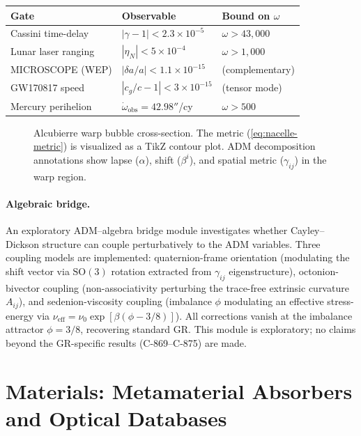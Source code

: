 \documentclass[12pt,openany]{report}
\theoremstyle{definition}
\theoremstyle{plain}
\theoremstyle{remark}
\begin{document}
\begin{center}
\begin{tabular}{lll}
\toprule
\textbf{Gate} & \textbf{Observable} & \textbf{Bound on $\omega$} \\
\midrule
Cassini time-delay  & $|\gamma-1| < 2.3\times10^{-5}$ & $\omega > 43{,}000$ \\
Lunar laser ranging & $|\eta_N| < 5\times10^{-4}$     & $\omega > 1{,}000$ \\
MICROSCOPE (WEP)    & $|\delta a/a| < 1.1\times10^{-15}$ & (complementary) \\
GW170817 speed      & $|c_g/c - 1| < 3\times10^{-15}$ & (tensor mode) \\
Mercury perihelion  & $\dot\omega_{\mathrm{obs}} = 42.98''$/cy & $\omega > 500$ \\
\bottomrule
\end{tabular}
\end{center}

\begin{figure}[htbp]
\centering

\caption{Alcubierre warp bubble cross-section.  The metric
(\cref{eq:nacelle-metric}) is visualized as a TikZ contour plot.
ADM decomposition annotations show lapse ($\alpha$), shift
($\beta^i$), and spatial metric ($\gamma_{ij}$) in the warp region.}
\label{fig:warp-bubble}
\end{figure}

\paragraph{Algebraic bridge.}
An exploratory ADM--algebra bridge module investigates whether
Cayley--Dickson structure can couple perturbatively to the ADM
variables.  Three coupling models are implemented:
quaternion-frame orientation (modulating the shift vector via $\mathrm{SO}(3)$
rotation extracted from $\gamma_{ij}$ eigenstructure), octonion-bivector
coupling (non-associativity perturbing the trace-free extrinsic curvature
$A_{ij}$), and sedenion-viscosity coupling (imbalance $\phi$
modulating an effective stress-energy via $\nu_{\mathrm{eff}} =
\nu_0 \exp[\beta(\phi - 3/8)]$).  All corrections vanish at the imbalance
attractor $\phi = 3/8$, recovering standard GR.  This module is
exploratory; no claims beyond the GR-specific results (C-869--C-875)
are made.


\section{Materials: Metamaterial Absorbers and Optical Databases}
\end{document}
